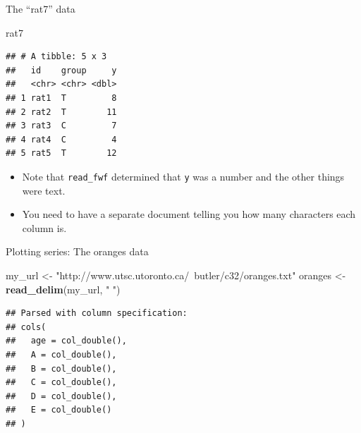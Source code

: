 \documentclass[
  ignorenonframetext,
]{beamer}
\newenvironment{Shaded}{\begin{snugshade}}{\end{snugshade}}
\newcommand{\KeywordTok}[1]{\textcolor[rgb]{0.13,0.29,0.53}{\textbf{#1}}}
\newcommand{\NormalTok}[1]{#1}
\newcommand{\StringTok}[1]{\textcolor[rgb]{0.31,0.60,0.02}{#1}}
\providecommand{\tightlist}{%
  \setlength{\itemsep}{0pt}\setlength{\parskip}{0pt}}
\begin{document}
\begin{frame}[fragile]{The ``rat7'' data}
\protect\hypertarget{the-rat7-data}{}

\begin{Shaded}
\begin{Highlighting}[]
\NormalTok{rat7}
\end{Highlighting}
\end{Shaded}

\begin{verbatim}
## # A tibble: 5 x 3
##   id    group     y
##   <chr> <chr> <dbl>
## 1 rat1  T         8
## 2 rat2  T        11
## 3 rat3  C         7
## 4 rat4  C         4
## 5 rat5  T        12
\end{verbatim}

\begin{itemize}
\tightlist
\item
  Note that \texttt{read\_fwf} determined that \texttt{y} was a number
  and the other things were text.
\item
  You need to have a separate document telling you how many characters
  each column is.
\end{itemize}

\end{frame}

\begin{frame}[fragile]{Plotting series: The oranges data}
\protect\hypertarget{plotting-series-the-oranges-data}{}

\begin{Shaded}
\begin{Highlighting}[]
\NormalTok{my_url <-}\StringTok{ "http://www.utsc.utoronto.ca/~butler/c32/oranges.txt"}
\NormalTok{oranges <-}\StringTok{ }\KeywordTok{read_delim}\NormalTok{(my_url, }\StringTok{" "}\NormalTok{)}
\end{Highlighting}
\end{Shaded}

\begin{verbatim}
## Parsed with column specification:
## cols(
##   age = col_double(),
##   A = col_double(),
##   B = col_double(),
##   C = col_double(),
##   D = col_double(),
##   E = col_double()
## )
\end{verbatim}

\end{frame}
\end{document}
